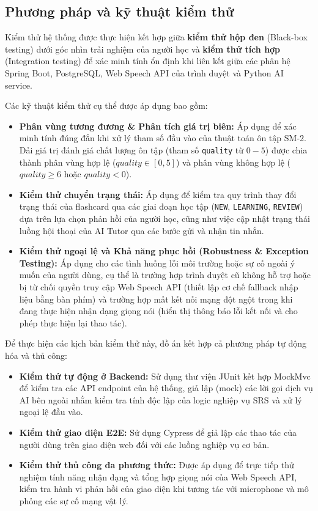 \documentclass[../DoAn.tex]{subfiles}
\begin{document}
\subsection{Phương pháp và kỹ thuật kiểm thử}
\label{subsection:4.4.1}

Kiểm thử hệ thống được thực hiện kết hợp giữa \textbf{kiểm thử hộp đen} (Black-box testing) dưới góc nhìn trải nghiệm của người học và \textbf{kiểm thử tích hợp} (Integration testing) để xác minh tính ổn định khi liên kết giữa các phân hệ Spring Boot, PostgreSQL, Web Speech API của trình duyệt và Python AI service.

Các kỹ thuật kiểm thử cụ thể được áp dụng bao gồm:
\begin{itemize}
    \item \textbf{Phân vùng tương đương \& Phân tích giá trị biên:} Áp dụng để xác minh tính đúng đắn khi xử lý tham số đầu vào của thuật toán ôn tập SM-2. Dải giá trị đánh giá chất lượng ôn tập (tham số \texttt{quality} từ $0 - 5$) được chia thành phân vùng hợp lệ ($quality \in [0, 5]$) và phân vùng không hợp lệ ($quality \ge 6$ hoặc $quality < 0$).
    \item \textbf{Kiểm thử chuyển trạng thái:} Áp dụng để kiểm tra quy trình thay đổi trạng thái của flashcard qua các giai đoạn học tập (\texttt{NEW}, \texttt{LEARNING}, \texttt{REVIEW}) dựa trên lựa chọn phản hồi của người học, cũng như việc cập nhật trạng thái luồng hội thoại của AI Tutor qua các bước gửi và nhận tin nhắn.
    \item \textbf{Kiểm thử ngoại lệ và Khả năng phục hồi (Robustness \& Exception Testing):} Áp dụng cho các tình huống lỗi môi trường hoặc sự cố ngoài ý muốn của người dùng, cụ thể là trường hợp trình duyệt cũ không hỗ trợ hoặc bị từ chối quyền truy cập Web Speech API (thiết lập cơ chế fallback nhập liệu bằng bàn phím) và trường hợp mất kết nối mạng đột ngột trong khi đang thực hiện nhận dạng giọng nói (hiển thị thông báo lỗi kết nối và cho phép thực hiện lại thao tác).
\end{itemize}

Để thực hiện các kịch bản kiểm thử này, đồ án kết hợp cả phương pháp tự động hóa và thủ công:
\begin{itemize}
    \item \textbf{Kiểm thử tự động ở Backend:} Sử dụng thư viện JUnit kết hợp MockMvc để kiểm tra các API endpoint của hệ thống, giả lập (mock) các lời gọi dịch vụ AI bên ngoài nhằm kiểm tra tính độc lập của logic nghiệp vụ SRS và xử lý ngoại lệ đầu vào.
    \item \textbf{Kiểm thử giao diện E2E:} Sử dụng Cypress để giả lập các thao tác của người dùng trên giao diện web đối với các luồng nghiệp vụ cơ bản.
    \item \textbf{Kiểm thử thủ công đa phương thức:} Được áp dụng để trực tiếp thử nghiệm tính năng nhận dạng và tổng hợp giọng nói của Web Speech API, kiểm tra hành vi phản hồi của giao diện khi tương tác với microphone và mô phỏng các sự cố mạng vật lý.
\end{itemize}
\end{document}
